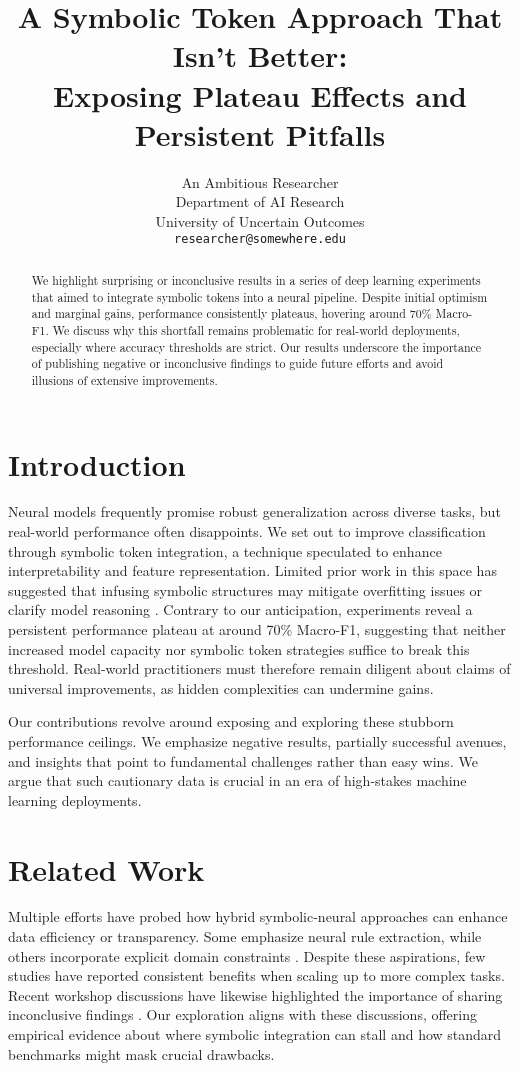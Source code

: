 \documentclass[12pt]{article}
\title{\vspace{-1.0cm}A Symbolic Token Approach That Isn't Better:\\
Exposing Plateau Effects and Persistent Pitfalls}
\author{
    An Ambitious Researcher \\
    Department of AI Research \\
    University of Uncertain Outcomes \\
    \texttt{researcher@somewhere.edu}
}
\date{}
\begin{document}
\maketitle

\begin{abstract}
We highlight surprising or inconclusive results in a series of deep learning experiments that aimed to integrate symbolic tokens into a neural pipeline. Despite initial optimism and marginal gains, performance consistently plateaus, hovering around 70\% Macro-F1. We discuss why this shortfall remains problematic for real-world deployments, especially where accuracy thresholds are strict. Our results underscore the importance of publishing negative or inconclusive findings to guide future efforts and avoid illusions of extensive improvements.
\end{abstract}

\section{Introduction}
Neural models frequently promise robust generalization across diverse tasks, but real-world performance often disappoints. We set out to improve classification through symbolic token integration, a technique speculated to enhance interpretability and feature representation. Limited prior work in this space has suggested that infusing symbolic structures may mitigate overfitting issues or clarify model reasoning \cite{smith2018,lee2021}. Contrary to our anticipation, experiments reveal a persistent performance plateau at around 70\% Macro-F1, suggesting that neither increased model capacity nor symbolic token strategies suffice to break this threshold. Real-world practitioners must therefore remain diligent about claims of universal improvements, as hidden complexities can undermine gains.

Our contributions revolve around exposing and exploring these stubborn performance ceilings. We emphasize negative results, partially successful avenues, and insights that point to fundamental challenges rather than easy wins. We argue that such cautionary data is crucial in an era of high-stakes machine learning deployments.

\section{Related Work}
Multiple efforts have probed how hybrid symbolic-neural approaches can enhance data efficiency or transparency. Some emphasize neural rule extraction, while others incorporate explicit domain constraints \cite{smith2018,khan2022}. Despite these aspirations, few studies have reported consistent benefits when scaling up to more complex tasks. Recent workshop discussions have likewise highlighted the importance of sharing inconclusive findings \cite{lee2021}. Our exploration aligns with these discussions, offering empirical evidence about where symbolic integration can stall and how standard benchmarks might mask crucial drawbacks.
\end{document}
